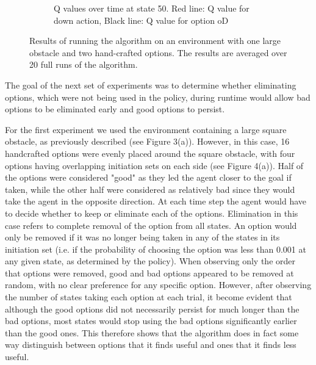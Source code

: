 \documentclass{acm_proc_article-sp}
\begin{document}
\begin{figure}[!htbp]
\begin{subfigure}[h]{.45\textwidth}
    \caption{Q values over time at state 50. Red line: Q value for down action, Black line: Q value for option oD}
  \end{subfigure}
  \caption{Results of running the algorithm on an environment with one large obstacle and two hand-crafted options. The results are averaged over 20 full runs of the algorithm.}
  \vspace{20pt}
\end{figure}

The goal of the next set of experiments was to determine whether eliminating options, which were not being used in the policy, during runtime would allow bad options to be eliminated early and good options to persist. 

For the first experiment we used the environment containing a large square obstacle, as previously described (see Figure 3(a)). However, in this case, 16 handcrafted options were evenly placed around the square obstacle, with four options having overlapping initiation sets on each side (see Figure 4(a)). Half of the options were considered "good" as they led the agent closer to the goal if taken, while the other half were considered as relatively bad since they would take the agent in the opposite direction. At each time step the agent would have to decide whether to keep or eliminate each of the options. Elimination in this case refers to complete removal of the option from all states. An option would only be removed if it was no longer being taken in any of the states in its initiation set (i.e. if the probability of choosing the option was less than 0.001 at any given state, as determined by the policy). 
	When observing only the order that options were removed, good and bad options appeared to be removed at random, with no clear preference for any specific option. However, after observing the number of states taking each option at each trial, it become evident that although the good options did not necessarily persist for much longer than the bad options, most states would stop using the bad options significantly earlier than the good ones. This therefore shows that the algorithm does in fact some way distinguish between options that it finds useful and ones that it finds less useful. 
\end{document}
